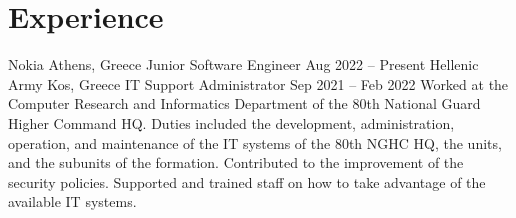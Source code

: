 \section{Experience}

\begin{itemize}
    \cventryiv
        {Nokia}
        {Athens, Greece}
        {Junior Software Engineer}
        {Aug 2022 -- Present}
    \cventryiv
        {Hellenic Army}
        {Kos, Greece}
        {IT Support Administrator}
        {Sep 2021 -- Feb 2022}
    \cventryi
        {Worked at the Computer Research and Informatics Department of the 80th National Guard Higher Command HQ. Duties included the development, administration, operation, and maintenance of the IT systems of the 80th NGHC HQ, the units, and the subunits of the formation. Contributed to the improvement of the security policies. Supported and trained staff on how to take advantage of the available IT systems.}
\end{itemize}
